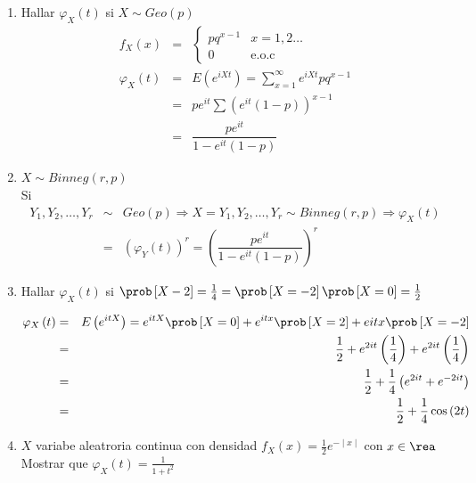 \begin{enumerate}
\item Hallar $\varphi_{X}\left(t\right)$ si $X \sim Geo \left(p \right)$
\begin{eqnarray*}
f_{X} \left(x \right) &=& \begin{cases}
pq^{x-1} & x=1,2\ldots \\
0 & \textrm{e.o.c}
\end{cases}\\
\varphi_{X}\left(t \right)&=& E \left( e^{iXt} \right)= \sum_{x=1}^{\infty} e^{iXt} pq^{x-1} \\
&=& pe^{it} \sum \left(e^{it}\left( 1-p\right) \right)^{x-1}\\
&=& \dfrac{pe^{it}}{1-e^{it}\left(1-p \right) }
\end{eqnarray*}
\item $X \sim Bin neg \left(r,p \right)$\\
Si 
\begin{eqnarray*}
Y_{1}, Y_{2}, \ldots, Y_{r} &\sim& Geo \left(p \right) \Rightarrow X= Y_{1}, Y_{2}, \ldots, Y_{r} \sim Binneg \left(r,p \right) \Rightarrow \varphi_{X} \left(t \right)\\
&=& \left( \varphi_{Y} \left(t \right) \right)^{r}
 =\left(\dfrac{pe^{it}}{1-e^{it}\left(1-p \right) } \right)^{r}
\end{eqnarray*}
\item Hallar $\varphi_{X} \left(t \right)$ si $\prob \left[X-2 \right]= \frac{1}{4}= \prob \left[X=-2 \right] \prob \left[X=0 \right]= \frac{1}{2}$

\begin{eqnarray*}
\varphi_{X} \left(t \right)&=& E \left(e^{itX} \right) = e^{itX} \prob \left[X=0 \right]+ e^{itx} \prob \left[X=2 \right]+ e {itx} \prob \left[X=-2 \right]\\
&=& \frac{1}{2}+ e^{2it}\left(\frac{1}{4}\right)+ e^{2it} \left(\frac{1}{4}\right)\\
&=& \frac{1}{2} + \frac{1}{4} \left(e^{2it}+ e^{-2it} \right)\\
&=& \frac{1}{2} + \frac{1}{4} \cos \left(2t \right)
\end{eqnarray*}

\item $X$ variabe aleatroria continua con densidad $f_{X} \left(x \right)= \frac{1}{2} e ^{- \mid x \mid}$ con $x \in \rea$ Mostrar que $\varphi_{X}\left(t \right)= \frac{1}{1+t^{2}}$


\end{enumerate}
